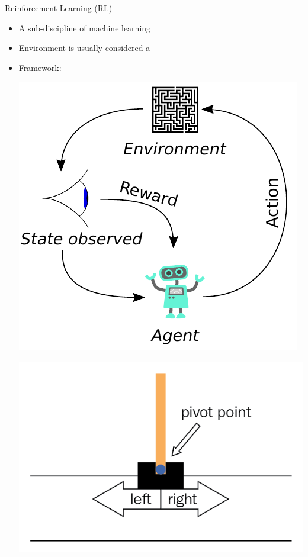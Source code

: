 \documentclass[aspectratio=1610]{beamer}
\begin{document}
\begin{frame}{Reinforcement Learning (RL)}
	\begin{itemize}
		\item A sub-discipline of machine learning
		\item Environment is usually considered a 
		\item Framework:\\
		\begin{minipage}[c]{0.45\textwidth}
			\includegraphics[width=\linewidth]{figures/reinforcement_learning}
		\end{minipage} \hfill
		\begin{minipage}[c]{0.20\textwidth}
			\includegraphics[width=\linewidth]{figures/cartpole.png}\\[1cm]

\end{minipage}
\end{itemize}
\end{frame}
\end{document}
